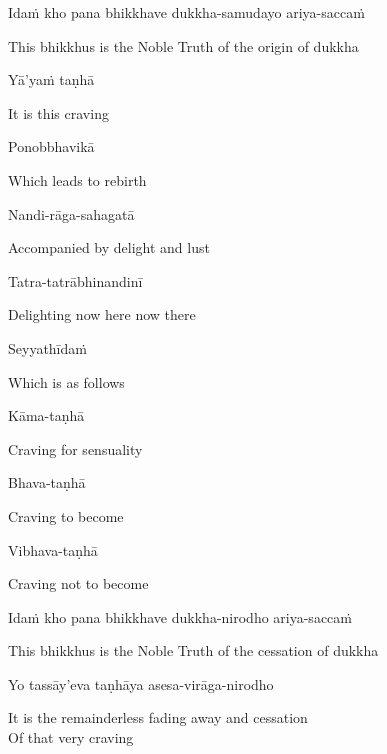Idaṁ kho pana bhikkhave dukkha-samudayo ariya-saccaṁ

\begin{english}
  This bhikkhus is the Noble Truth of the origin of dukkha
\end{english}

Yā’yaṁ taṇhā

\begin{english}
  It is this craving
\end{english}

Ponobbhavikā

\begin{english}
  Which leads to rebirth
\end{english}

Nandi-rāga-sahagatā

\begin{english}
  Accompanied by delight and lust
\end{english}

Tatra-tatrābhinandinī

\begin{english}
  Delighting now here now there
\end{english}

Seyyathīdaṁ

\begin{english}
  Which is as follows
\end{english}

Kāma-taṇhā

\begin{english}
  Craving for sensuality
\end{english}

Bhava-taṇhā

\begin{english}
  Craving to become
\end{english}

Vibhava-taṇhā

\begin{english}
  Craving not to become
\end{english}

Idaṁ kho pana bhikkhave dukkha-nirodho ariya-saccaṁ

\begin{english}
  This bhikkhus is the Noble Truth of the cessation of dukkha
\end{english}

Yo tassāy’eva taṇhāya asesa-virāga-nirodho

\begin{english}
  It is the remainderless fading away and cessation\\
  Of that very craving
\end{english}

